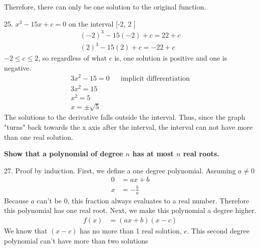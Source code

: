 \documentclass{article}
\begin{document}
\begin{description}
\begin{description}
                        Therefore, there can only be one solution to the original function.
                  \item 25. $x^3 - 15x + c = 0$ on the interval [-2, 2 ]
                        \begin{align*}
                              (-2)^3 - 15(-2) + c = 22 + c \\
                              (2)^3 - 15(2) + c = -22 + c
                        \end{align*}
                        $-2 \leq c \leq 2$, so regardless of what $c$ is, one solution is positive and one is negative.
                        \begin{align*}
                              3x^2 - 15 = 0 &  & \text{implicit differentiation} \\
                              3x^2 = 15                                          \\
                              x^2 = 5                                            \\
                              x = \pm \sqrt{5}
                        \end{align*}
                        The solutions to the derivative falls outside the interval. Thus, since the graph "turns" back
                        towards the x axis after the interval, the interval can not have more than one real solution.
            \end{description}
      \item\textbf{Show that a polynomial of degree $n$ has at most $n$ real roots.}
            \begin{description}
                  \item 27. Proof by induction. First, we define a one degree polynomial. Assuming $a \neq 0$
                        \begin{align*}
                              0 & = ax + b      \\
                              x & =-\frac{b}{a}
                        \end{align*}
                        Because $a$ can't be 0, this fraction always evaluates to a real number. Therefore this polynomial
                        has one real root. Next, we make this polynomial a degree higher.
                        \begin{align*}
                              f(x) & = (ax + b)(x - c)
                        \end{align*}
                        We know that $(x - c)$ has no more than 1 real solution, $c$. This second degree polynomial can't have more than two solutions

\end{description}
\end{description}
\end{document}
